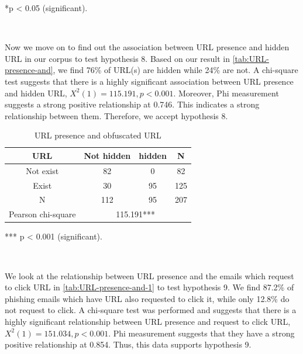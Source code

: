 {*}p < 0.05 (significant).

\ 

Now we move on to find out the association between URL presence and
hidden URL in our corpus to test hypothesis 8. Based on our result
in \autoref{tab:URL-presence-and}, we find 76\% of URL(s) are hidden
while 24\% are not. A chi-square test suggests that there is a highly
significant association between URL presence and hidden URL, $X^{2}(1)=115.191,p<0.001$.
Moreover, Phi measurement suggests a strong positive relationship
at 0.746. This indicates a strong relationship between them. Therefore,
we accept hypothesis 8.

\begin{minipage}[t]{1\columnwidth}%
\begin{longtable}{cccc}
\caption{\label{tab:URL-presence-and}URL presence and obfuscated URL}
\tabularnewline
\toprule 
{\footnotesize{}URL} & {\footnotesize{}Not hidden} & {\footnotesize{}hidden} & \multirow{1}{*}{{\footnotesize{}N}}\tabularnewline
\midrule 
\multirow{1}{*}{{\footnotesize{}Not exist}} & {\footnotesize{}82} & {\footnotesize{}0} & \multirow{1}{*}{{\footnotesize{}82}}\tabularnewline
\midrule 
\multirow{1}{*}{{\footnotesize{}Exist}} & {\footnotesize{}30} & {\footnotesize{}95} & \multirow{1}{*}{{\footnotesize{}125}}\tabularnewline
\midrule
\midrule 
{\footnotesize{}N} & {\footnotesize{}112} & {\footnotesize{}95} & {\footnotesize{}207}\tabularnewline
\midrule
\midrule 
{\footnotesize{}Pearson chi-square} & \multicolumn{3}{c}{{\footnotesize{}115.191{*}{*}{*}}}\tabularnewline
\midrule
\end{longtable}%
\end{minipage}

{*}{*}{*} p < 0.001 (significant).

\ 

We look at the relationship between URL presence and the emails which
request to click URL in \autoref{tab:URL-presence-and-1} to test
hypothesis 9. We find 87.2\% of phishing emails which have URL also
requested to click it, while only 12.8\% do not request to click.
A chi-square test was performed and suggests that there is a highly
significant relationship between URL presence and request to click
URL, $X^{2}(1)=151.034,p<0.001$. Phi measurement suggests that they
have a strong positive relationship at 0.854. Thus, this data supports
hypothesis 9.

